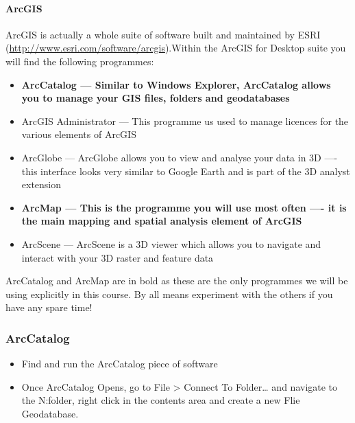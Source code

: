 \documentclass[]{book}
\let\oldparagraph\paragraph
\renewcommand{\paragraph}[1]{\oldparagraph{#1}\mbox{}}
\begin{document}
\hypertarget{arcgis-1}{%
\paragraph{ArcGIS}\label{arcgis-1}}

ArcGIS is actually a whole suite of software built and maintained by ESRI (\url{http://www.esri.com/software/arcgis}).Within the ArcGIS for Desktop suite you will find the following programmes:

\begin{itemize}
\item
  \textbf{ArcCatalog --- Similar to Windows Explorer, ArcCatalog allows you to manage your GIS files, folders and geodatabases}
\item
  ArcGIS Administrator --- This programme us used to manage licences for the various elements of ArcGIS
\item
  ArcGlobe --- ArcGlobe allows you to view and analyse your data in 3D ---- this interface looks very similar to Google Earth and is part of the 3D analyst extension
\item
  \textbf{ArcMap --- This is the programme you will use most often ---- it is the main mapping and spatial analysis element of ArcGIS}
\item
  ArcScene --- ArcScene is a 3D viewer which allows you to navigate and interact with your 3D raster and feature data
\end{itemize}

ArcCatalog and ArcMap are in bold as these are the only programmes we will be using explicitly in this course. By all means experiment with the others if you have any spare time!

\hypertarget{arccatalog}{%
\subsubsection{ArcCatalog}\label{arccatalog}}

\begin{itemize}
\item
  Find and run the ArcCatalog piece of software
\item
  Once ArcCatalog Opens, go to File \textgreater{} Connect To Folder\ldots{} and navigate to the N:\GIS folder, right click in the contents area and create a new Flie Geodatabase.
\end{itemize}
\end{document}
